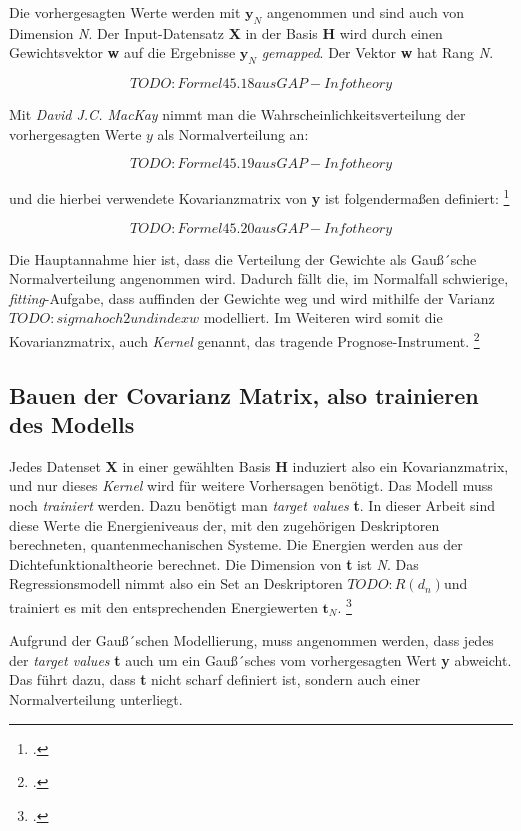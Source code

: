 Die vorhergesagten Werte werden mit $\textbf{y}_N$ angenommen und sind auch von Dimension \textit{N}. Der Input-Datensatz \textbf{X} in der Basis \textbf{H} wird durch einen Gewichtsvektor \textbf{w} auf die Ergebnisse $\textbf{y}_N$ \textit{gemapped}. Der Vektor \textbf{w} hat Rang \textit{N}.

$$TODO: Formel 45.18 aus GAP-Info theory$$

Mit \textit{David J.C. MacKay} nimmt man die Wahrscheinlichkeitsverteilung der vorhergesagten Werte $y$ als Normalverteilung an: 

$$TODO: Formel 45.19 aus GAP-Info theory$$

und die hierbei verwendete Kovarianzmatrix von \textbf{y} ist folgendermaßen definiert: \footcite[540]{GAP-info-theory}


$$TODO: Formel 45.20 aus GAP-Info theory$$

Die Hauptannahme hier ist, dass die Verteilung der Gewichte als Gauß´sche Normalverteilung angenommen wird. Dadurch fällt die, im Normalfall schwierige, \textit{fitting}-Aufgabe,  dass auffinden der Gewichte weg und wird mithilfe der Varianz $TODO: sigma hoch 2 und index w$ modelliert. Im Weiteren wird somit die Kovarianzmatrix, auch \textit{Kernel} genannt, das tragende Prognose-Instrument. \footcite[1052]{GAP-intro}




\subsection{Bauen der Covarianz Matrix, also trainieren des Modells}


Jedes Datenset \textbf{X} in einer gewählten Basis \textbf{H} induziert also ein Kovarianzmatrix, und nur dieses \textit{Kernel} wird für weitere Vorhersagen benötigt. Das Modell muss noch \textit{trainiert} werden. Dazu benötigt man \textit{target values} \textbf{t}. In dieser Arbeit sind diese Werte die Energieniveaus der, mit den zugehörigen Deskriptoren berechneten,  quantenmechanischen Systeme. Die Energien werden aus der Dichtefunktionaltheorie berechnet. Die Dimension von \textbf{t} ist \textit{N}. Das Regressionsmodell nimmt also ein Set an Deskriptoren $TODO: R(d_n) $und trainiert es mit den entsprechenden Energiewerten $\textbf{t}_N$. \footcite[3]{GAP-2009}

Aufgrund der Gauß´schen Modellierung, muss angenommen werden, dass jedes der \textit{target values} \textbf{t} auch um ein Gauß´sches vom vorhergesagten Wert \textbf{y} abweicht. Das führt dazu, dass \textbf{t} nicht scharf definiert ist, sondern auch einer Normalverteilung unterliegt. 


